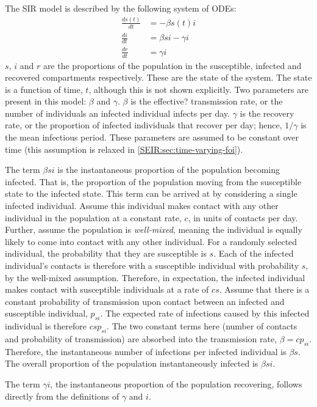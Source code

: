 \documentclass[thesis.tex]{subfiles}
\begin{document}
The SIR model is described by the following system of ODEs:
\begin{align}
\frac{ds(t)}{dt} &= -\beta s(t)i \\
\frac{di}{dt} &= \beta si - \gamma i \\
\frac{dr}{dt} &= \gamma i
\end{align}
$s$, $i$ and $r$ are the proportions of the population in the susceptible, infected and recovered compartments respectively.
These are the state of the system.
The state is a function of time, $t$, although this is not shown explicitly.
Two parameters are present in this model: $\beta$ and $\gamma$.
$\beta$ is the effective? transmission rate, or the number of individuals an infected individual infects per day.
$\gamma$ is the recovery rate, or the proportion of infected individuals that recover per day; hence, $1/\gamma$ is the mean infectious period.
These parameters are assumed to be constant over time (this assumption is relaxed in \cref{SEIR:sec:time-varying-foi}).

The term $\beta si$ is the instantaneous proportion of the population becoming infected.
That is, the proportion of the population moving from the susceptible state to the infected state.
This term can be arrived at by considering a single infected individual.
Assume this individual makes contact with any other individual in the population at a constant rate, $c$, in units of contacts per day.
Further, assume the population is \emph{well-mixed}, meaning the individual is equally likely to come into contact with any other individual.
For a randomly selected individual, the probability that they are susceptible is $s$.
Each of the infected individual's contacts is therefore with a susceptible individual with probability $s$, by the well-mixed assumption.
Therefore, in expectation, the infected individual makes contact with susceptible individuals at a rate of $cs$.
Assume that there is a constant probability of transmission upon contact between an infected and susceptible individual, $p_{si}$.
The expected rate of infections caused by this infected individual is therefore $cs p_{si}$.
The two constant terms here (number of contacts and probability of transmission) are absorbed into the transmission rate, $\beta = c p_{si}$.
Therefore, the instantaneous number of infections per infected individual is $\beta s$.
The overall proportion of the population instantaneously infected is $\beta si$.

The term $\gamma i$, the instantaneous proportion of the population recovering, follows directly from the definitions of $\gamma$ and $i$.
\end{document}
